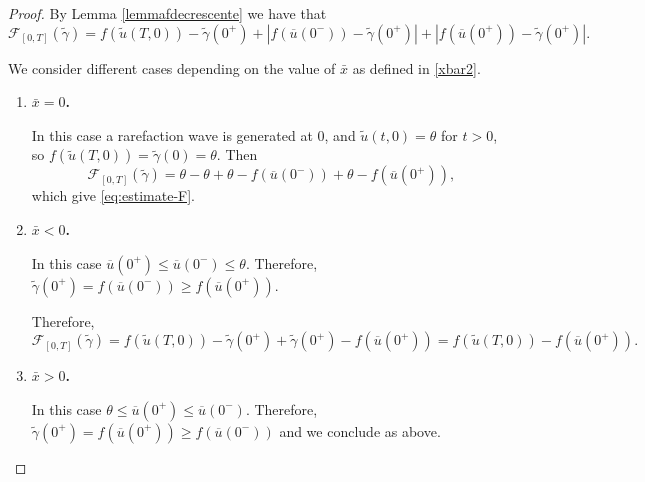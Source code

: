 \documentclass[a4paper, 10pt, final]{article}
\begin{document}
 
 
\begin{proof} 
By Lemma \ref{lemmafdecrescente} we have that
\[\mathcal F_{[0,T]}(\widetilde \gamma)=f( \widetilde u(T,0))- \widetilde \gamma(0^+) +
    |f(\overline u(0^-))- \widetilde\gamma(0^+)| + 
    |f(\overline u(0^+))- \widetilde \gamma(0^+)| .   \]

We consider different cases depending on the value of $\bar x$ as defined in \eqref{xbar2}.    

\begin{enumerate}
\item {\bf $\bar x=0$. }

In this case a rarefaction wave is generated at $0$, and $\widetilde u(t, 0)=\theta$ for $t>0$, so $f( \widetilde u(T,0))= \widetilde \gamma(0)=\theta$. 
Then 
\[\mathcal F_{[0,T]}(\widetilde \gamma)=\theta-\theta +
   \theta- f(\overline u(0^-))+\theta-  
    f(\overline u(0^+)),   \] which give \eqref{eq:estimate-F}.
    
  \item  {\bf   $\bar x<0$.} 

In this case $\overline u(0^+)\leq \overline u(0^-)\leq \theta$. Therefore, $\widetilde\gamma(0^+)=f(\overline u(0^-)) \geq f(\overline u(0^+)) $.
  
  
  Therefore, 
  \begin{equation*}
    \mathcal F_{[0,T]}  (\widetilde \gamma) = f( \widetilde u(T,0))- \widetilde \gamma(0^+) +
    \widetilde\gamma(0^+)- 
    f(\overline u(0^+)) = f( \widetilde u(T,0))- f(\overline u(0^+)).
  \end{equation*}   
 
   \item  {\bf   $\bar x>0$.} 

In this case $\theta\leq \overline u(0^+)\leq \overline u(0^-)$. Therefore, $\widetilde\gamma(0^+)=f(\overline u(0^+)) \geq f(\overline u(0^-)) $ 
and we conclude as above.   
\end{enumerate}
\end{proof} 
\end{document}
